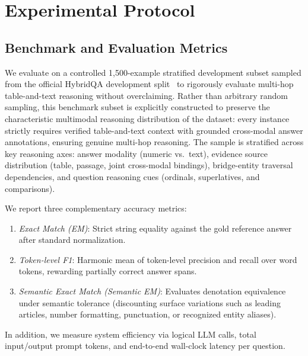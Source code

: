 \documentclass[runningheads]{llncs}
\begin{document}



\section{Experimental Protocol}
\label{sec:experiments}
\subsection{Benchmark and Evaluation Metrics}
We evaluate on a controlled 1,500-example stratified development subset sampled from the official HybridQA development split~\cite{hybridqa} to rigorously evaluate multi-hop table-and-text reasoning without overclaiming. Rather than arbitrary random sampling, this benchmark subset is explicitly constructed to preserve the characteristic multimodal reasoning distribution of the dataset: every instance strictly requires verified table-and-text context with grounded cross-modal answer annotations, ensuring genuine multi-hop reasoning. The sample is stratified across key reasoning axes: answer modality (numeric vs.\ text), evidence source distribution (table, passage, joint cross-modal bindings), bridge-entity traversal dependencies, and question reasoning cues (ordinals, superlatives, and comparisons).

We report three complementary accuracy metrics:
\begin{enumerate}
    \item \emph{Exact Match (EM)}: Strict string equality against the gold reference answer after standard normalization.
    \item \emph{Token-level F1}: Harmonic mean of token-level precision and recall over word tokens, rewarding partially correct answer spans.
    \item \emph{Semantic Exact Match (Semantic EM)}: Evaluates denotation equivalence under semantic tolerance (discounting surface variations such as leading articles, number formatting, punctuation, or recognized entity aliases).
\end{enumerate}
In addition, we measure system efficiency via logical LLM calls, total input/output prompt tokens, and end-to-end wall-clock latency per question.
\end{document}
